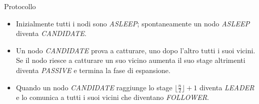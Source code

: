 \begin{frame}{Protocollo}
 \begin{itemize}
 \setlength\itemsep{2em}
  \item Inizialmente tutti i nodi sono \textit{ASLEEP}; spontaneamente un nodo \textit{ASLEEP} diventa \textit{CANDIDATE}.
  \item Un nodo \textit{CANDIDATE} prova a catturare, uno dopo l'altro tutti i suoi vicini. Se il nodo riesce a catturare un suo vicino aumenta il suo stage altrimenti diventa \textit{PASSIVE}
  e termina la fase di espansione.
  \item Quando un nodo \textit{CANDIDATE} raggiunge lo stage $\lfloor\frac{n}{2}\rfloor+1$ diventa \textit{LEADER} e lo comunica a tutti i suoi vicini che diventano \textit{FOLLOWER}.
 \end{itemize}
\end{frame}




